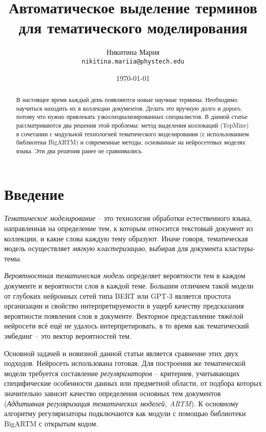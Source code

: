 \documentclass[a4paper, 12pt]{article}
\title{Автоматическое выделение терминов для тематического моделирования}
\author{
	  Никитина Мария \\
	\texttt{nikitina.mariia@phystech.edu} \\
}
\date{\today}
\begin{document}
\maketitle

\begin{abstract}
В настоящее время каждый день появляются новые научные термины. Необходимо научиться находить их в коллекции документов. Делать это вручную долго и дорого, потому что нужно привлекать узкоспециализированных специалистов. В данной статье рассматриваются два решения этой проблемы: метод выделения коллокаций (TopMine) в сочетании с модульной технологией тематического моделирования (с использованием библиотеки BigARTM) и современные методы, основанные на нейросетевых моделях языка. Эти два решения ранее не сравнивались.
\end{abstract}


\section{Введение}

        \textit{Тематическое моделирование} -- это технология обработки естественного языка, направленная на определение тем, к которым относится текстовый документ из коллекции, и какие слова каждую тему образуют. Иначе говоря, тематическая модель осуществляет \textit{мягкую кластеризацию}, выбирая для документа кластеры-темы.

        \textit{Вероятностная тематическая модель} определяет вероятности тем в каждом документе и вероятности слов в каждой теме. Большим отличием такой модели от глубоких нейронных сетей типа BERT \citep{bert} или GPT-3 \citep{Brown2020LanguageMA} является простота организации и свойство интерпретируемости в ущерб качеству предсказания вероятности появления слов в документе. Векторное представление тяжёлой нейросети всё ещё не удалось интерпретировать, в то время как тематический эмбединг -- это вектор вероятностей тем.

        Основной задачей и новизной данной статьи является сравнение этих двух подходов. Нейросеть использована готовая. 
        Для построения же тематической модели требуется составление \textit{регуляризаторов} -- критериев, учитывающих специфические особенности данных или предметной области, от подбора которых значительно зависит качество определения основных тем документов (\textit{Аддитивная регуляризация тематических моделей, ARTM}). К основному алгоритму регуляризаторы подключаются как модули с помощью библиотеки BigARTM \citep{Vorontsov2015} с открытым кодом.
\end{document}
